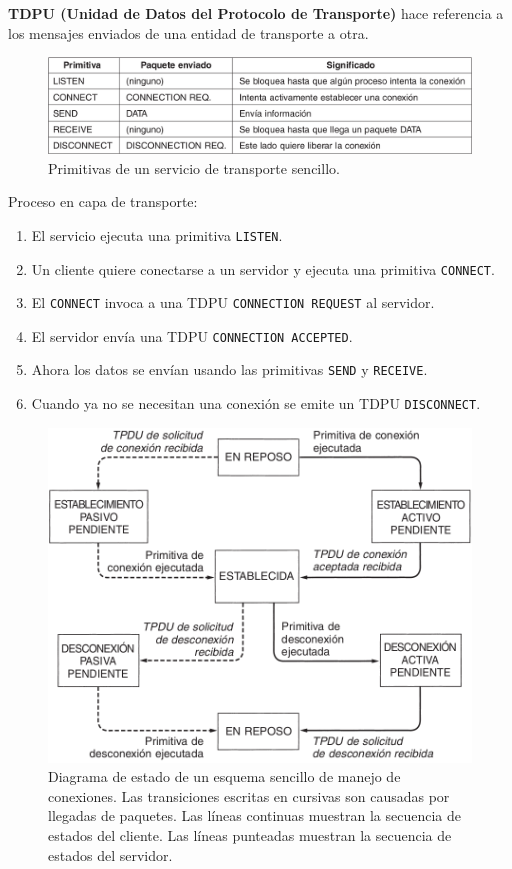 \documentclass[10pt,a4paper]{article}
\begin{document}
\textbf{TDPU (Unidad de Datos del Protocolo de Transporte)} hace referencia a los mensajes enviados de una entidad de transporte a otra.

\begin{figure}[ht!]
  \caption{Primitivas de un servicio de transporte sencillo.}
  \label{fig:primitivas_transporte}
  \centerline{\includegraphics[width=0.95\textwidth-\fboxrule-\fboxrule]{imgs/primitivas_transporte.png}}
\end{figure}

Proceso en capa de transporte:
\begin{enumerate}
\item El servicio ejecuta una primitiva \texttt{LISTEN}.
\item Un cliente quiere conectarse a un servidor y ejecuta una primitiva \texttt{CONNECT}.
\item El \texttt{CONNECT} invoca a una TDPU \texttt{CONNECTION REQUEST} al servidor.
\item El servidor envía una TDPU \texttt{CONNECTION ACCEPTED}.
\item Ahora los datos se envían usando las primitivas \texttt{SEND} y \texttt{RECEIVE}.
\item Cuando ya no se necesitan una conexión se emite un TDPU \texttt{DISCONNECT}.
\end{enumerate}

\begin{figure}[ht!]
  \caption{Diagrama de estado de un esquema sencillo de manejo de conexiones. Las transiciones escritas en cursivas son causadas por llegadas de paquetes. Las líneas continuas muestran la secuencia de estados del cliente. Las líneas punteadas muestran la secuencia de estados del servidor.}
  \label{fig:digrama_estado_TDPU}
  \centerline{\includegraphics[width=0.8\textwidth-\fboxrule-\fboxrule]{imgs/digrama_estado_TDPU.png}}
\end{figure}
\end{document}
